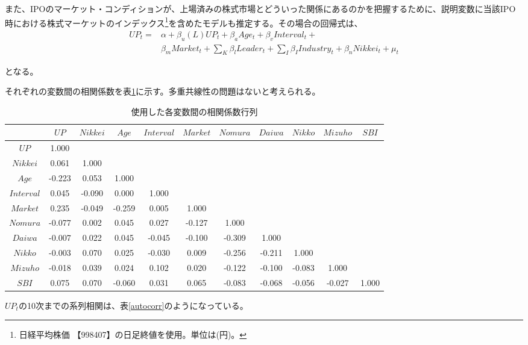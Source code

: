 \documentclass{jsarticle}
\begin{document}
また、IPOのマーケット・コンディションが、上場済みの株式市場とどういった関係にあるのかを把握するために、説明変数に当該IPO時における株式マーケットのインデックス\footnote[14]{日経平均株価 【998407】の日足終値を使用。単位は(円)。}を含めたモデルも推定する。その場合の回帰式は、
\begin{equation}
\label{nikkeireg}
\begin{split}
	UP_t =  &\alpha + \beta_u (L) UP_t + \beta_a Age_t + \beta_v Interval_t + \\
	   &\beta_m Market_t + \sum_{K} \beta_l Leader_t +  \sum_{I} \beta_I Industry_t + \beta_n Nikkei_t+  \mu_t
\end{split}
\end{equation}

となる。\par

\newpage

それぞれの変数間の相関係数を表\ref{corr}に示す。多重共線性の問題はないと考えられる。
\begin{table}[t]
  \begin{center}
  \caption{使用した各変数間の相関係数行列}
\begin{tabular}{c|cccccccccc}
\hline
 & $UP$ & $Nikkei$ & $Age$ & $Interval$ & $Market$ & $Nomura$ & $Daiwa$ & $Nikko$ & $Mizuho$ & $SBI$ \\
 \hline
$UP$ & 1.000 & &&&&&&&& \\
$Nikkei$ & 0.061 & 1.000 & &&&&&&& \\
$Age$ & -0.223 & 0.053 & 1.000 & &&&&&&  \\
$Interval$ & 0.045 & -0.090 & 0.000 & 1.000 & &&&&& \\
$Market$ & 0.235 & -0.049 & -0.259 & 0.005 & 1.000 & &&&& \\
$Nomura$ & -0.077 & 0.002 & 0.045 & 0.027 & -0.127 & 1.000 & &&& \\
$Daiwa$ & -0.007 & 0.022 & 0.045 & -0.045 & -0.100 & -0.309 & 1.000 & && \\
$Nikko$ & -0.003 & 0.070 & 0.025 & -0.030 & 0.009 & -0.256 & -0.211 & 1.000 &  &  \\
$Mizuho$ & -0.018 & 0.039 & 0.024 & 0.102 & 0.020 & -0.122 & -0.100 & -0.083 & 1.000 & \\
$SBI$ & 0.075 & 0.070 & -0.060 & 0.031 & 0.065 & -0.083 & -0.068 & -0.056 & -0.027 & 1.000 \\
\hline
	\end{tabular}
	\label{corr} 
  \end{center}
\end{table}
\par
$UP_t$の10次までの系列相関は、表\ref{autocorr}のようになっている。
\end{document}
